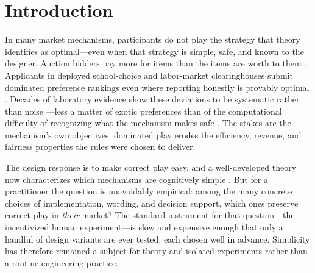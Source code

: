\section{Introduction}\label{sec:intro}

In many market mechanisms, participants do not play the strategy that theory identifies as optimal---even when that strategy is simple, safe, and known to the designer. Auction bidders pay more for items than the items are worth to them \citep{kagel1995individual}. Applicants in deployed school-choice and labor-market clearinghouses submit dominated preference rankings even where reporting honestly is provably optimal \citep{rees2018suboptimal, roth1982economics}. Decades of laboratory evidence show these deviations to be systematic rather than noise \citep{kagel2020handbook}---less a matter of exotic preferences than of the computational difficulty of recognizing what the mechanism makes safe \citep{oprea2024decisions}. The stakes are the mechanism's own objectives: dominated play erodes the efficiency, revenue, and fairness properties the rules were chosen to deliver.

The design response is to make correct play easy, and a well-developed theory now characterizes which mechanisms are cognitively simple \citep{li2017obviously, li2024designing}. But for a practitioner the question is unavoidably empirical: among the many concrete choices of implementation, wording, and decision support, which ones preserve correct play in \emph{their} market? The standard instrument for that question---the incentivized human experiment---is slow and expensive enough that only a handful of design variants are ever tested, each chosen well in advance. Simplicity has therefore remained a subject for theory and isolated experiments rather than a routine engineering practice.

